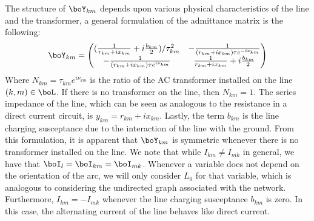 \documentclass[11pt,a4paper,oneside,openany]{book}
\numberwithin{definition}{section}
\numberwithin{theorem}{section}
\numberwithin{problem}{section}
\begin{document}
The structure of $\boY_{km}$ depends upon various physical characteristics of the line and the transformer, a general formulation of the admittance matrix is the following:
\begin{equation}
\label{eq: admittance matrix}
    \boY_{km}= 
    \begin{pmatrix}
(\frac{1}{r_{km}+ix_{km}} + i \frac{b_{km}}{2})/\tau^2_{km} & -\frac{1}{(r_{km}+ix_{km})\tau e^{-i\nu_{km}}} \\
-\frac{1}{(r_{km}+ix_{km})\tau e^{i\nu_{km}}} & \frac{1}{r_{km}+ix_{km}} + i \frac{b_{km}}{2}
\end{pmatrix}
\end{equation}
Where $N_{km} = \tau_{km}e^{i \nu_{km}}$ is the ratio of the AC transformer installed on the line $(k,m) \in \boL$. If there is no transformer on the line, then $N_{km} = 1$. The series impedance of the line, which can be seen as analogous to the resistance in a direct current circuit, is $y_{km} = r_{km} + ix_{km}$. Lastly, the term $b_{km}$ is the line charging susceptance due to the interaction of the line with the ground. From this formulation, it is apparent that $\boY_{km}$ is symmetric whenever there is no transformer installed on the line. We note that while $I_{km} \neq I_{mk}$ in general, we have that $\boI_{l} = \boI_{km} = \boI_{mk}$. Whenever a variable does not depend on the orientation of the arc, we will only consider $L_0$ for that variable, which is analogous to considering the undirected graph associated with the network. Furthermore, $I_{km} = -I_{mk}$ whenever the line charging susceptance $b_{km}$ is zero. In this case, the alternating current of the line behaves like direct current.
\end{document}
